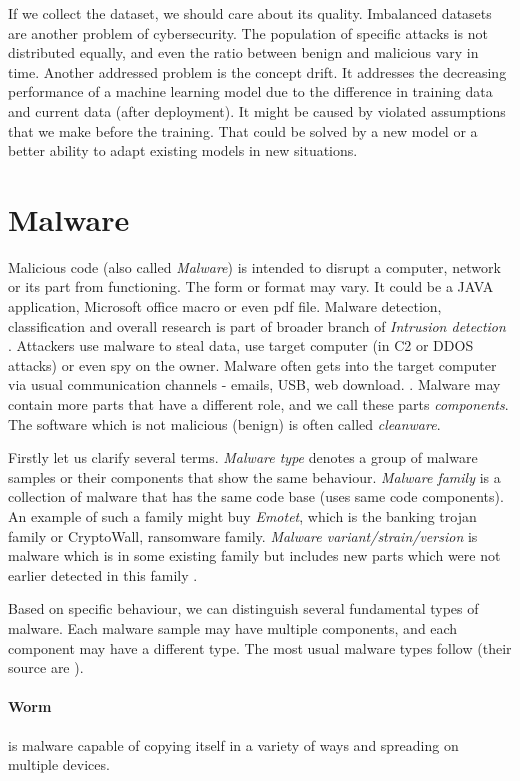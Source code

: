 If we collect the dataset, we should care about its quality. Imbalanced datasets are another problem of cybersecurity. The population of specific attacks is not distributed equally, and even the ratio between benign and malicious vary in time. Another addressed problem is the concept drift. It addresses the decreasing performance of a machine learning model due to the difference in training data and current data (after deployment).  It might be caused by violated assumptions that we make before the training. That could be solved by a new model or a better ability to adapt existing models in new situations.

\section{Malware}
Malicious code (also called \emph{Malware}) is intended to disrupt a computer, network or its part from functioning. The form or format may vary. It could be a JAVA application, Microsoft office macro or even pdf file. Malware detection, classification and overall research is part of broader branch of \emph{Intrusion detection} \cite{Cole2009}. Attackers use malware to steal data, use target computer (in C2 or DDOS attacks) or even spy on the owner. Malware often gets into the target computer via usual communication channels - emails, USB, web download. \cite{KA2018}. Malware may contain more parts that have a different role, and we call these parts \emph{components}. The software which is not malicious (benign) is often called \emph{cleanware}.

Firstly let us clarify several terms. \emph{Malware type} denotes a group of malware samples or their components that show the same behaviour. \emph{Malware family} is a collection of malware that has the same code base (uses same code components). An example of such a family might buy \emph{Emotet}, which is the banking trojan family or CryptoWall, ransomware family. \emph{Malware variant/strain/version} is malware which is in some existing family but includes new parts which were not earlier detected in this family \cite{Cohen2019}.

Based on specific behaviour, we can distinguish several fundamental types of malware. Each malware sample may have multiple components, and each component may have a different type. The most usual malware types follow (their source are \cite{Cole2009, KA2018, Graham2010, Sikorski2012}).

\paragraph{Worm} is malware capable of copying itself in a variety of ways and spreading on multiple devices.
